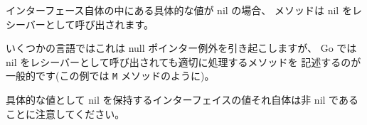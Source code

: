 インターフェース自体の中にある具体的な値が nil の場合、
メソッドは nil をレシーバーとして呼び出されます。

いくつかの言語ではこれは null ポインター例外を引き起こしますが、
Go では nil をレシーバーとして呼び出されても適切に処理するメソッドを
記述するのが一般的です(この例では \texttt{M} メソッドのように)。

具体的な値として nil を保持するインターフェイスの値それ自体は非 nil 
であることに注意してください。